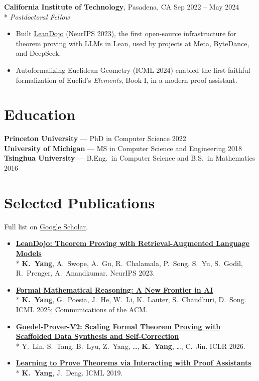 \documentclass[10pt]{article}
\newcommand{\entry}[4]{%
  \textbf{#1}, #2 \hfill #4\\*
  \textit{#3}\par}
\newcommand{\pub}[3]{%
  \item \href{#3}{\textbf{#1}}\\* {\small #2}}
\begin{document}
\vspace{0.25em}
\entry{California Institute of Technology}{Pasadena, CA}{Postdoctoral Fellow}{Sep 2022 -- May 2024}
\begin{itemize}
  \item Built \href{https://www.leandojo.org/}{LeanDojo} (NeurIPS 2023), the first
        open-source infrastructure for theorem proving with LLMs in Lean, used by projects
        at Meta, ByteDance, and DeepSeek.
  \item Autoformalizing Euclidean Geometry (ICML 2024) enabled the first faithful
        formalization of Euclid's \textit{Elements}, Book I, in a modern proof assistant.
\end{itemize}

\section{Education}

\textbf{Princeton University} --- PhD in Computer Science \hfill 2022\\[0.05em]
\textbf{University of Michigan} --- MS in Computer Science and Engineering \hfill 2018\\[0.05em]
\textbf{Tsinghua University} --- B.Eng.\ in Computer Science and B.S.\ in Mathematics \hfill 2016

\section{Selected Publications}

Full list on \href{https://scholar.google.com/citations?user=FciCu4EAAAAJ}{Google Scholar}.

\begin{itemize}
  \pub{LeanDojo: Theorem Proving with Retrieval-Augmented Language Models}
      {\textbf{K.~Yang}, A.~Swope, A.~Gu, R.~Chalamala, P.~Song, S.~Yu, S.~Godil, R.~Prenger, A.~Anandkumar. NeurIPS 2023.}
      {https://www.leandojo.org/}
  \pub{Formal Mathematical Reasoning: A New Frontier in AI}
      {\textbf{K.~Yang}, G.~Poesia, J.~He, W.~Li, K.~Lauter, S.~Chaudhuri, D.~Song. ICML 2025; Communications of the ACM.}
      {https://arxiv.org/abs/2412.16075}
  \pub{Goedel-Prover-V2: Scaling Formal Theorem Proving with Scaffolded Data Synthesis and Self-Correction}
      {Y.~Lin, S.~Tang, B.~Lyu, Z.~Yang, \ldots, \textbf{K.~Yang}, \ldots, C.~Jin. ICLR 2026.}
      {https://blog.goedel-prover.com/}
  \pub{Learning to Prove Theorems via Interacting with Proof Assistants}
      {\textbf{K.~Yang}, J.~Deng. ICML 2019.}
      {https://arxiv.org/abs/1905.09381}
\end{itemize}
\end{document}
